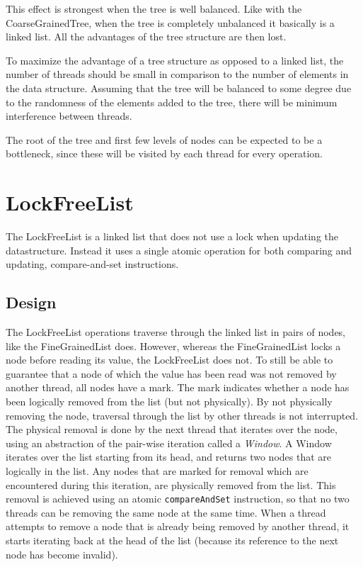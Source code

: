 \documentclass[a4paper]{article}
\begin{document}
This effect is strongest when the tree is well balanced. Like with the
CoarseGrainedTree, when the tree is completely unbalanced it basically is
a linked list. All the advantages of the tree structure are then lost.

To maximize the advantage of a tree structure as opposed to a linked list, the
number of threads should be small in comparison to the number of elements in the
data structure. Assuming that the tree will be balanced to some degree due to the
randomness of the elements added to the tree, there will be minimum interference
between threads.

The root of the tree and first few levels of nodes can be expected to be a
bottleneck, since these will be visited by each thread for every operation.

\section{LockFreeList}

The LockFreeList is a linked list that does not use a lock when updating
the datastructure. Instead it uses a single atomic operation for both
comparing and updating, compare-and-set instructions.

\subsection{Design}

The LockFreeList operations traverse through the linked list in pairs of nodes, like
the FineGrainedList does. However, whereas the FineGrainedList locks a node before
reading its value, the LockFreeList does not. To still be able to guarantee that a
node of which the value has been read was not removed by another thread, all nodes
have a mark. The mark indicates whether a node has been logically removed from the
list (but not physically). By not physically removing the node, traversal through the
list by other threads is not interrupted. The physical removal is done by the next
thread that iterates over the node, using an abstraction of the pair-wise iteration
called a \emph{Window}. A Window iterates over the list starting from its head, and
returns two nodes that are logically in the list. Any nodes that are marked for removal
which are encountered during this iteration, are physically removed from the list. This
removal is achieved using an atomic \texttt{compareAndSet} instruction, so that no two
threads can be removing the same node at the same time. When a thread attempts to
remove a node that is already being removed by another thread, it starts iterating back
at the head of the list (because its reference to the next node has become invalid).
\end{document}
